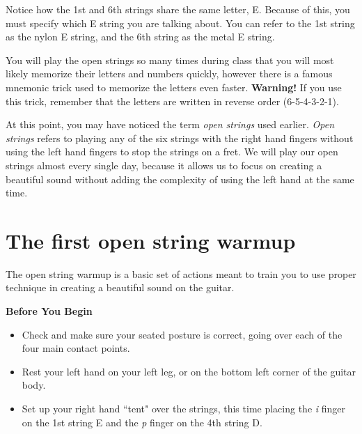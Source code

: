 Notice how the 1st and 6th strings share the same letter, E. Because of this, you must specify which E string you are talking about. You can refer to the 1st string as the nylon E string, and the 6th string as the metal E string. 

You will play the open strings so many times during class that you will most likely memorize their letters and numbers quickly, however there is a famous mnemonic trick used to memorize the letters even faster. \textbf{Warning!} If you use this trick, remember that the letters are written in reverse order (6-5-4-3-2-1).

\begin{center}
\end{center}

At this point, you may have noticed the term \textit{open strings} used earlier. \textit{Open strings} refers to playing any of the six strings with the right hand fingers without using the left hand fingers to stop the strings on a fret. We will play our open strings almost every single day, because it allows us to focus on creating a beautiful sound without adding the complexity of using the left hand at the same time.

\section{The first open string warmup}

The open string warmup is a basic set of actions meant to train you to use proper technique in creating a beautiful sound on the guitar. 

\noindent \textbf{Before You Begin}
\begin{itemize}
	\item Check and make sure your seated posture is correct, going over each of the four main contact points.
	\item Rest your left hand on your left leg, or on the bottom left corner of the guitar body.
	\item Set up your right hand ``tent" over the strings, this time placing the \textit{i} finger on the 1st string E and the \textit{p} finger on the 4th string D.
\end{itemize}

